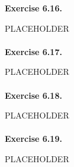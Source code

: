 \documentclass{article}
\begin{document}
\textbf{Exercise 6.16.}

PLACEHOLDER \\\\






\textbf{Exercise 6.17.}

PLACEHOLDER \\\\






\textbf{Exercise 6.18.}

PLACEHOLDER \\\\






\textbf{Exercise 6.19.}

PLACEHOLDER \\\\



\end{document}
